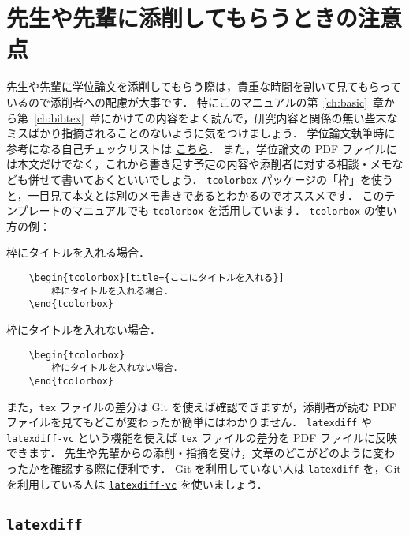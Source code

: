 \chapter{先生や先輩に添削してもらうときの注意点}
\label{ch:check}

先生や先輩に学位論文を添削してもらう際は，貴重な時間を割いて見てもらっているので添削者への配慮が大事です．
特にこのマニュアルの第~\ref{ch:basic}~章から第~\ref{ch:bibtex}~章にかけての内容をよく読んで，研究内容と関係の無い些末なミスばかり指摘されることのないように気をつけましょう．
学位論文執筆時に参考になる自己チェックリストは \href{https://github.com/ryo-ARAKI/thesis_template_ou_es/blob/master/self_checklist.md}{こちら}．
また，学位論文の PDF ファイルには本文だけでなく，これから書き足す予定の内容や添削者に対する相談・メモなども併せて書いておくといいでしょう．
\verb|tcolorbox| パッケージの「枠」を使うと，一目見て本文とは別のメモ書きであるとわかるのでオススメです．
このテンプレートのマニュアルでも \verb|tcolorbox| を活用しています．
\verb|tcolorbox| の使い方の例：
\begin{tcolorbox}[title={ここにタイトルを入れる}]
    枠にタイトルを入れる場合．
    \tcblower
\begin{verbatim}
    \begin{tcolorbox}[title={ここにタイトルを入れる}]
        枠にタイトルを入れる場合．
    \end{tcolorbox}
\end{verbatim}
\end{tcolorbox}

\begin{tcolorbox}
    枠にタイトルを入れない場合．
    \tcblower
\begin{verbatim}
    \begin{tcolorbox}
        枠にタイトルを入れない場合．
    \end{tcolorbox}
\end{verbatim}
\end{tcolorbox}

また，\verb|tex| ファイルの差分は Git を使えば確認できますが，添削者が読む PDF ファイルを見てもどこが変わったか簡単にはわかりません．
\verb|latexdiff| や \verb|latexdiff-vc| という機能を使えば \verb|tex| ファイルの差分を PDF ファイルに反映できます．
先生や先輩からの添削・指摘を受け，文章のどこがどのように変わったかを確認する際に便利です．
Git を利用していない人は \hyperref[sec:latexdiff]{\texttt{latexdiff}} を，Git を利用している人は \hyperref[sec:latexdiff-vc]{\texttt{latexdiff-vc}} を使いましょう．

\section{\texttt{latexdiff}}
\label{sec:latexdiff}

